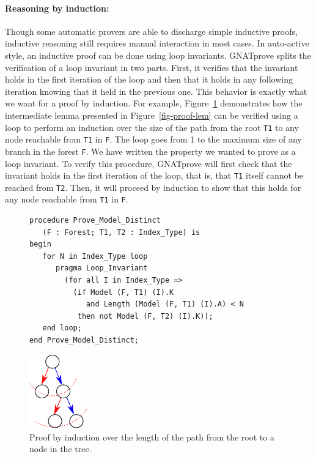 \documentclass{llncs}
\newcommand{\gnatprove}{GNATprove\xspace}
\begin{document}
\paragraph{Reasoning by induction:}
Though some automatic provers are able to discharge simple inductive proofs, inductive reasoning
still requires manual interaction in most cases. In auto-active style, an inductive proof can be done
using loop invariants. \gnatprove splits the
verification of a loop invariant in two parts. First, it verifies that the invariant holds in the first iteration of the
loop and then that it holds in any following iteration knowing that it held in the previous one.
This behavior is exactly what we want for a proof by induction. For example, Figure~\ref{fig-proof-ind}
demonstrates how the intermediate lemma presented in Figure~\ref{fig-proof-lem} can be verified
using a loop to perform an induction over the size of the path from the root \texttt{T1} to any node reachable
from \texttt{T1} in \texttt{F}. The loop goes from 1 to the maximum size of any branch
in the forest \texttt{F}. We have written the property we wanted to prove as a loop invariant. To verify this procedure, \gnatprove will
first check that the invariant holds in the first iteration of the loop, that is, that \texttt{T1} itself cannot
be reached from \texttt{T2}. Then, it will proceed by induction to show that this holds for any node reachable
from \texttt{T1} in \texttt{F}.

\begin{figure}
\begin{minipage}[c]{.75\linewidth}
\begin{small}
\begin{lstlisting}
procedure Prove_Model_Distinct
   (F : Forest; T1, T2 : Index_Type) is
begin
   for N in Index_Type loop
      pragma Loop_Invariant
        (for all I in Index_Type =>
          (if Model (F, T1) (I).K
             and Length (Model (F, T1) (I).A) < N
           then not Model (F, T2) (I).K));
   end loop;
end Prove_Model_Distinct;
\end{lstlisting}
\end{small}
\end{minipage}\hfill
\begin{minipage}[c]{.22\linewidth}
\begin{center}
\includegraphics[width=25mm]{induction.pdf}
\end{center}
\end{minipage}
\caption{\label{fig-proof-ind} Proof by induction over the length of the path from the root to a node in the tree.}
\end{figure}
\end{document}
